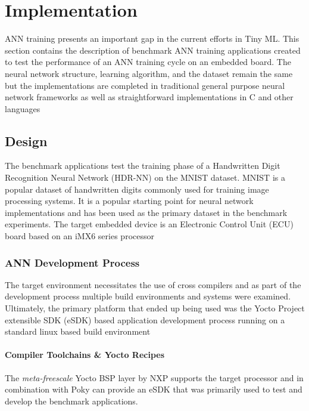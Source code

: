 \part{Implementation}

ANN training presents an important gap in the current efforts in Tiny ML. This section contains the description of benchmark ANN training applications created to test the performance of an ANN training cycle on an embedded board. The neural network structure, learning algorithm, and the dataset remain the same but the implementations are completed in traditional general purpose neural network frameworks as well as straightforward implementations in C and other languages

\chapter{Design}

The benchmark applications test the training phase of a Handwritten Digit Recognition Neural Network (HDR-NN) on the MNIST \cite{mnist} dataset. MNIST is a popular dataset of handwritten digits commonly used for training image processing systems. It is a popular starting point for neural network implementations and has been used as the primary dataset in the benchmark experiments. The target embedded device is an Electronic Control Unit (ECU) board based on an iMX6 series processor

\section[Artificial Neural Network Development Process]{ANN Development Process}

The target environment necessitates the use of cross compilers and as part of the development process multiple build environments and systems were examined. Ultimately, the primary platform that ended up being used was the Yocto Project extensible SDK (eSDK) based application development process running on a standard linux based build environment

\subsection[Cross compilers \& Build System]{Compiler Toolchains \& Yocto Recipes}

The \textit{meta-freescale} Yocto BSP layer by NXP supports the target processor and in combination with Poky can provide an eSDK that was primarily used to test and develop the benchmark applications.


